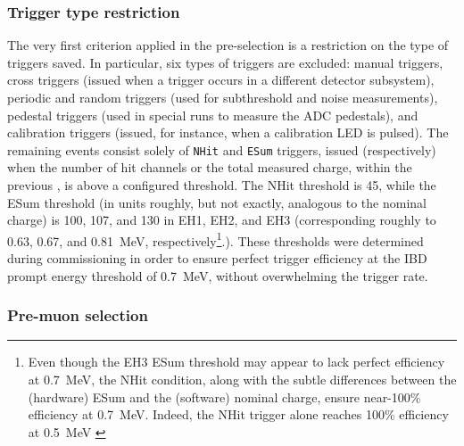 \documentclass[../thesis.tex]{subfiles}
\begin{document}
\subsubsection{Trigger type restriction}
\label{sec:selTrigType}

The very first criterion applied in the pre-selection is a restriction on the type of triggers saved. In particular, six types of triggers are excluded: manual triggers, cross triggers (issued when a trigger occurs in a different detector subsystem), periodic and random triggers (used for subthreshold and noise measurements), pedestal triggers (used in special runs to measure the ADC pedestals), and calibration triggers (issued, for instance, when a calibration LED is pulsed). The remaining events consist solely of \texttt{NHit} and \texttt{ESum} triggers, issued (respectively) when the number of hit channels or the total measured charge, within the previous \us, is above a configured threshold. The NHit threshold is 45, while the ESum threshold (in units roughly, but not exactly, analogous to the nominal charge) is 100, 107, and 130 in EH1, EH2, and EH3 (corresponding roughly to 0.63, 0.67, and 0.81~MeV, respectively\footnote{Even though the EH3 ESum threshold may appear to lack perfect efficiency at 0.7~MeV, the NHit condition, along with the subtle differences between the (hardware) ESum and the (software) nominal charge, ensure near-100\% efficiency at 0.7~MeV. Indeed, the NHit trigger alone reaches 100\% efficiency at 0.5~MeV \cite{weili_trig_eff}}.). These thresholds were determined during commissioning in order to ensure perfect trigger efficiency at the IBD prompt energy threshold of 0.7~MeV, without overwhelming the trigger rate.

\subsubsection{Pre-muon selection}
\label{sec:selPreMuons}
\end{document}
